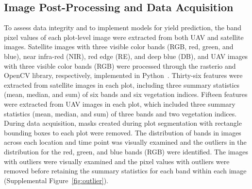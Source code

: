 \documentclass[12pt,twoside]{gsag3jnl}
\begin{document}
\subsection{Image Post-Processing and Data Acquisition}
To assess data integrity and to implement models for yield prediction, the band pixel values of each plot-level image were extracted from both UAV and satellite images. Satellite images with three visible color bands (RGB, red, green, and blue), near infra-red (NIR), red edge (RE), and deep blue (DB), and UAV images with three visible color bands (RGB) were processed through the rasterio and OpenCV library, respectively, implemented in Python~\citep{gillies2019rasterio, opencv_library}.  Thirty-six features were extracted from satellite images in each plot, including three summary statistics (mean, median, and sum) of six bands and six vegetation indices. Fifteen features were extracted from UAV images in each plot, which included three summary statistics (mean, median, and sum) of three bands and two vegetation indices. During data acquisition, masks created during plot segmentation with rectangle bounding boxes to each plot were removed. The distribution of bands in images across each location and time point was visually examined and the outliers in the distribution for the red, green, and blue bands (RGB) were identified. The images with outliers were visually examined and the pixel values with outliers were removed before retaining the summary statistics for each band within each image (Supplemental Figure~\ref{fig:outlier}). 
\end{document}
